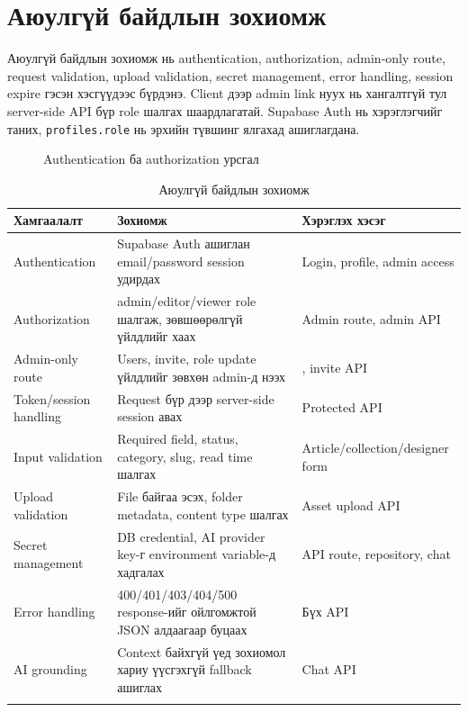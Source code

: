 \section{Аюулгүй байдлын зохиомж}
Аюулгүй байдлын зохиомж нь authentication, authorization, admin-only route, request validation, upload validation, secret management, error handling, session expire гэсэн хэсгүүдээс бүрдэнэ. Client дээр admin link нуух нь хангалтгүй тул server-side API бүр role шалгах шаардлагатай. Supabase Auth нь хэрэглэгчийг таних, \texttt{profiles.role} нь эрхийн түвшинг ялгахад ашиглагдана.

\begin{figure}[H]
  \centering
  \resizebox{0.72\textwidth}{!}{}
  \caption[Authentication ба authorization урсгал]{Authentication ба authorization урсгал}
  \label{fig:ch3-auth-flow}
\end{figure}

\begin{longtable}{|L{0.24\textwidth}|L{0.38\textwidth}|L{0.24\textwidth}|}
  \hline
  \textbf{Хамгаалалт} & \textbf{Зохиомж} & \textbf{Хэрэглэх хэсэг} \\ \hline
  Authentication & Supabase Auth ашиглан email/password session удирдах & Login, profile, admin access \\ \hline
  Authorization & admin/editor/viewer role шалгаж, зөвшөөрөлгүй үйлдлийг хаах & Admin route, admin API \\ \hline
  Admin-only route & Users, invite, role update үйлдлийг зөвхөн admin-д нээх & , invite API \\ \hline
  Token/session handling & Request бүр дээр server-side session авах & Protected API \\ \hline
  Input validation & Required field, status, category, slug, read time шалгах & Article/collection/designer form \\ \hline
  Upload validation & File байгаа эсэх, folder metadata, content type шалгах & Asset upload API \\ \hline
  Secret management & DB credential, AI provider key-г environment variable-д хадгалах & API route, repository, chat \\ \hline
  Error handling & 400/401/403/404/500 response-ийг ойлгомжтой JSON алдаагаар буцаах & Бүх API \\ \hline
  AI grounding & Context байхгүй үед зохиомол хариу үүсгэхгүй fallback ашиглах & Chat API \\ \hline
  \caption{Аюулгүй байдлын зохиомж}
  \label{tab:ch3-security-design}\\
\end{longtable}

